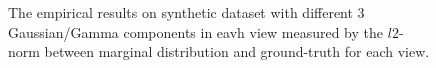 \documentclass[11pt]{article}
\begin{document}
\begin{figure}
\caption{The empirical results on synthetic dataset with different 3 Gaussian/Gamma components in eavh view measured by the $l2$-norm between marginal distribution and ground-truth for each view.}
\end{figure}
\end{document}
